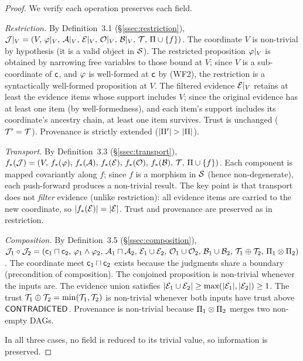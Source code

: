 \documentclass[11pt]{article}
\begin{document}
\begin{proof}
We verify each operation preserves each field.

\emph{Restriction.}  By Definition~3.1 (\S\ref{ssec:restriction}),
$\mathcal{J}|_V = (V,\,\varphi|_V,\,\mathcal{A}|_V,\,\mathcal{E}|_V,\,\mathcal{O}|_V,\,\mathcal{B}|_V,\,\mathcal{T},\,\Pi \cup \{f\})$.
The coordinate $V$ is non-trivial by hypothesis (it is a valid object in
$\mathcal{S}$).  The restricted proposition $\varphi|_V$ is obtained by narrowing
free variables to those bound at $V$; since $V$ is a sub-coordinate of
$\mathsf{c}$, and $\varphi$ is well-formed at $\mathsf{c}$ by (WF2), the restriction
is a syntactically well-formed proposition at $V$.
The filtered evidence $\mathcal{E}|_V$ retains at least the evidence items whose
support includes $V$; since the original evidence has at least one item
(by well-formedness), and each item's support includes its coordinate's
ancestry chain, at least one item survives.
Trust is unchanged ($\mathcal{T}' = \mathcal{T}$).
Provenance is strictly extended ($|\Pi'| > |\Pi|$).

\emph{Transport.}  By Definition~3.3 (\S\ref{ssec:transport}),
$f_*(\mathcal{J}) = (V,\,f_*(\varphi),\,f_*(\mathcal{A}),\,f_*(\mathcal{E}),\,f_*(\mathcal{O}),\,f_*(\mathcal{B}),\,\mathcal{T},\,\Pi \cup \{f\})$.
Each component is mapped covariantly along $f$; since $f$ is a morphism
in $\mathcal{S}$ (hence non-degenerate), each push-forward produces a non-trivial
result.  The key point is that transport does not \emph{filter} evidence
(unlike restriction): all evidence items are carried to the new coordinate,
so $|f_*(\mathcal{E})| = |\mathcal{E}|$.  Trust and provenance are preserved as in
restriction.

\emph{Composition.}  By Definition~3.5 (\S\ref{ssec:composition}),
$\mathcal{J}_1 \circ \mathcal{J}_2 = (\mathsf{c}_1 \sqcap \mathsf{c}_2,\,\varphi_1 \wedge \varphi_2,\,\mathcal{A}_1 \sqcap \mathcal{A}_2,\,\mathcal{E}_1 \cup \mathcal{E}_2,\,\mathcal{O}_1 \cup \mathcal{O}_2,\,\mathcal{B}_1 \cup \mathcal{B}_2,\,\mathcal{T}_1 \oplus \mathcal{T}_2,\,\Pi_1 \otimes \Pi_2)$.
The coordinate meet $\mathsf{c}_1 \sqcap \mathsf{c}_2$ exists because the judgments
share a boundary (precondition of composition).
The conjoined proposition is non-trivial whenever the inputs are.
The evidence union satisfies
$|\mathcal{E}_1 \cup \mathcal{E}_2| \geq \max(|\mathcal{E}_1|, |\mathcal{E}_2|) \geq 1$.
The trust $\mathcal{T}_1 \oplus \mathcal{T}_2 = \min(\mathcal{T}_1, \mathcal{T}_2)$ is
non-trivial whenever both inputs have trust above $\mathsf{CONTRADICTED}$.
Provenance is non-trivial because $\Pi_1 \otimes \Pi_2$ merges
two non-empty DAGs.

In all three cases, no field is reduced to its trivial value, so
information is preserved.
\end{proof}
\end{document}
